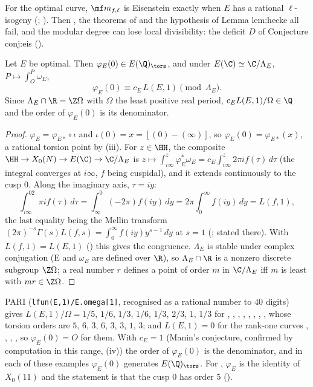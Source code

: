 For the optimal curve, $\mf m_{f,\ell}$ is Eisenstein exactly when $E$ has a rational $\ell$-isogeny (; ). Then ,
the theorems of \cite{DFG04} and the hypothesis of Lemma lem:hecke all fail, and the modular degree can lose local divisibility: the deficit $D$ of Conjecture conj:eis ().

\begin{proposition}\label{prop:moddeg:image-of-zero}
Let $E$ be optimal. Then $\varphi_E(0)\in E(\Q)_{\tors}$, and under $E(\C)\simeq\C/\Lambda_E$, $P\mapsto\int_O^P\omega_E$,
\[
\varphi_E(0)\equiv c_E\,L(E,1)\pmod{\Lambda_E}.
\]
Since $\Lambda_E\cap\R=\Z\Omega$ with $\Omega$ the least positive real period, $c_EL(E,1)/\Omega\in\Q$ and the order of $\varphi_E(0)$ is its denominator.
\end{proposition}

\begin{proof}
$\varphi_E=\varphi_{E*}\circ\iota$ and $\iota(0)=x=[(0)-(\infty)]$, so $\varphi_E(0)=\varphi_{E*}(x)$, a rational torsion point by (iii). For $z\in\HH$, the composite
$\HH\to X_0(N)\to E(\C)\to\C/\Lambda_E$ is $z\mapsto\int_{i\infty}^z\varphi_E^*\omega_E=c_E\int_{i\infty}^z2\pi if(\tau)\,d\tau$ (the integral converges at $i\infty$, $f$ being cuspidal), and it extends continuously to the
cusp $0$. Along the imaginary axis, $\tau=iy$:
\[
\int_{i\infty}^02\pi if(\tau)\,d\tau=\int_\infty^0(-2\pi)f(iy)\,dy=2\pi\int_0^\infty f(iy)\,dy=L(f,1),
\]
the last equality being the Mellin transform $(2\pi)^{-s}\Gamma(s)L(f,s)=\int_0^\infty f(iy)y^{s-1}\,dy$ at $s=1$ (; stated there). With $L(f,1)=L(E,1)$ ()
this gives the congruence. $\Lambda_E$ is stable under complex conjugation (E and $\omega_E$ are defined over $\R$), so $\Lambda_E\cap\R$ is a nonzero discrete subgroup $\Z\Omega$; a real number $r$ defines a
point of order $m$ in $\C/\Lambda_E$ iff $m$ is least with $mr\in\Z\Omega$.
\end{proof}

\begin{example}\label{ex:moddeg:image-of-zero}
PARI (\texttt{lfun(E,1)/E.omega[1]}, recognised as a rational number to $40$ digits) gives $L(E,1)/\Omega=1/5$, $1/6$, $1/3$, $1/6$, $1/3$, $2/3$, $1$, $1/3$ for , , , ,
, , , , whose torsion orders are $5$, $6$, $3$, $6$, $3$, $3$, $1$, $3$; and $L(E,1)=0$ for the rank-one curves , , ,
, so $\varphi_E(0)=O$ for them. With $c_E=1$ (Manin's conjecture, confirmed by computation in this range, (iv)) the order of $\varphi_E(0)$ is the denominator, and in each of these examples $\varphi_E(0)$ generates $E(\Q)_{\tors}$. For , $\varphi_E$ is the
identity of $X_0(11)$ and the statement is that the cusp $0$ has order $5$ ().
\end{example}

